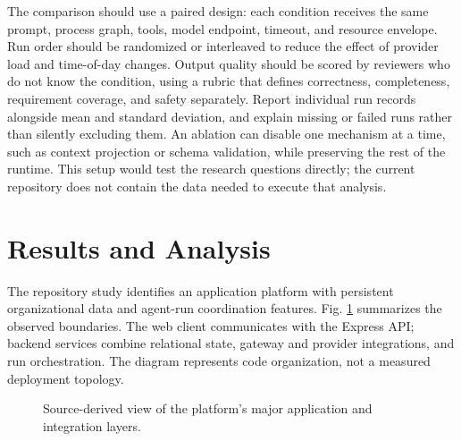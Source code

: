 \documentclass[12pt,onecolumn,draftclsnofoot]{IEEEtran}
\begin{document}
The comparison should use a paired design: each condition receives the same prompt, process graph, tools, model endpoint, timeout, and resource envelope. Run order should be randomized or interleaved to reduce the effect of provider load and time-of-day changes. Output quality should be scored by reviewers who do not know the condition, using a rubric that defines correctness, completeness, requirement coverage, and safety separately. Report individual run records alongside mean and standard deviation, and explain missing or failed runs rather than silently excluding them. An ablation can disable one mechanism at a time, such as context projection or schema validation, while preserving the rest of the runtime. This setup would test the research questions directly; the current repository does not contain the data needed to execute that analysis.

\section{Results and Analysis}
The repository study identifies an application platform with persistent organizational data and agent-run coordination features. Fig. \ref{fig:repository-architecture} summarizes the observed boundaries. The web client communicates with the Express API; backend services combine relational state, gateway and provider integrations, and run orchestration. The diagram represents code organization, not a measured deployment topology.

\begin{figure}[t]
\centering
{}
\caption{Source-derived view of the platform's major application and integration layers.}
\label{fig:repository-architecture}
\end{figure}
\end{document}
